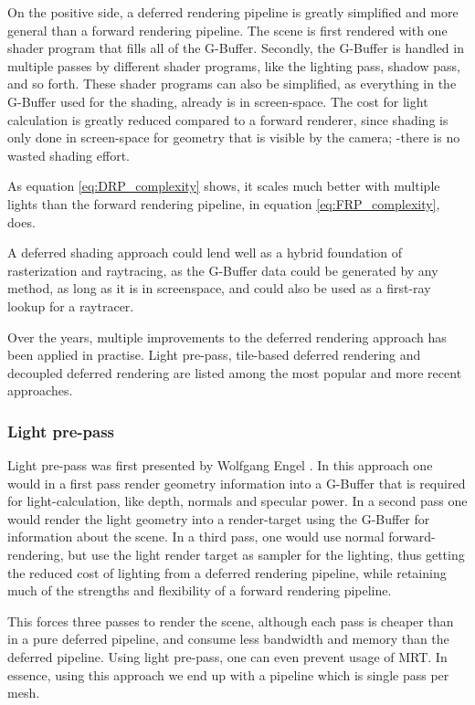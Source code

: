 On the positive side, a deferred rendering pipeline is greatly simplified and more general than a forward rendering pipeline. The scene is first rendered with one shader program that fills all of the G-Buffer. Secondly, the G-Buffer is handled in multiple passes by different shader programs, like the lighting pass, shadow pass, and so forth. These shader programs can also be simplified, as everything in the G-Buffer used for the shading, already is in screen-space. The cost for light calculation is greatly reduced compared to a forward renderer, since shading is only done in screen-space for geometry that is visible by the camera; -there is no wasted shading effort.

As equation \eqref{eq:DRP_complexity} shows, it scales much better with multiple lights than the forward rendering pipeline, in equation \eqref{eq:FRP_complexity}, does.

A deferred shading approach could lend well as a hybrid foundation of rasterization and raytracing, as the G-Buffer data could be generated by any method, as long as it is in screenspace, and could also be used as a first-ray lookup for a raytracer.

Over the years, multiple improvements to the deferred rendering approach has been applied in practise. Light pre-pass, tile-based deferred rendering and decoupled deferred rendering are listed among the most popular and more recent approaches.

\subsubsection{Light pre-pass}

Light pre-pass was first presented by Wolfgang Engel \cite{engel2008}. In this approach one would in a first pass render geometry information into a G-Buffer that is required for light-calculation, like depth, normals and specular power. In a second pass one would render the light geometry into a render-target using the G-Buffer for information about the scene. In a third pass, one would use normal forward-rendering, but use the light render target as sampler for the lighting, thus getting the reduced cost of lighting from a deferred rendering pipeline, while retaining much of the strengths and flexibility of a forward rendering pipeline. 

This forces three passes to render the scene, although each pass is cheaper than in a pure deferred pipeline, and consume less bandwidth and memory than the deferred pipeline. Using light pre-pass, one can even prevent usage of MRT. In essence, using this approach we end up with a pipeline which is single pass per mesh.

